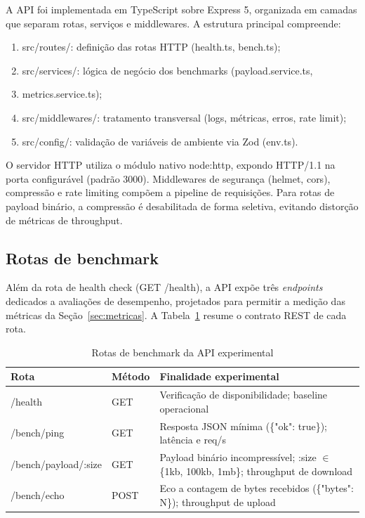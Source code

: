 A API foi implementada em TypeScript sobre Express 5, organizada em camadas que separam rotas, serviços e middlewares. A estrutura principal compreende:

\begin{enumerate}[label=\alph*)]
\item src/routes/: definição das rotas HTTP (health.ts, bench.ts);
\item src/services/: lógica de negócio dos benchmarks (payload.service.ts,
\item metrics.service.ts);
\item src/middlewares/: tratamento transversal (logs, métricas, erros, rate limit);
\item src/config/: validação de variáveis de ambiente via Zod (env.ts).
\end{enumerate}

O servidor HTTP utiliza o módulo nativo node:http, expondo HTTP/1.1 na porta configurável (padrão 3000). Middlewares de segurança (helmet, cors), compressão e rate limiting compõem a pipeline de requisições. Para rotas de payload binário, a compressão é desabilitada de forma seletiva, evitando distorção de métricas de throughput.

\subsection{Rotas de benchmark}

Além da rota de health check (GET /health), a API expõe três \textit{endpoints} dedicados a avaliações de desempenho, projetados para permitir a medição das métricas da Seção~\ref{sec:metricas}. A Tabela~\ref{tab:rotas-benchmark} resume o contrato REST de cada rota.

\begin{table}[htbp]
\centering
\caption{Rotas de benchmark da API experimental}\label{tab:rotas-benchmark}
\small
\setlength{\tabcolsep}{3pt}
\begin{tabular}{@{}>{\raggedright\arraybackslash}p{38mm}>{\raggedright\arraybackslash}p{16mm}>{\raggedright\arraybackslash}p{92mm}@{}}
\hline
Rota & Método & Finalidade experimental \\
\hline
/health & GET & Verificação de disponibilidade; baseline operacional \\
/bench/ping & GET & Resposta JSON mínima (\{"ok": true\}); latência e req/s \\
/bench/\allowbreak payload/:size & GET & Payload binário incompressível; :size $\in$ \{1kb, 100kb, 1mb\}; throughput de download \\
/bench/echo & POST & Eco a contagem de bytes recebidos (\{"bytes": N\}); throughput de upload \\
\hline
\end{tabular}
\end{table}

